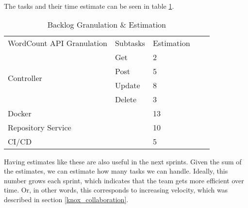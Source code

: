 The tasks and their time estimate can be seen in table \ref{BacklogEstimationSprint3}.
\begin{table}[h]
\centering
\begin{tabular}{|l|l|l|ll}
\cline{1-3}
WordCount API Granulation   & Subtasks & Estimation &  &  \\ \cline{1-3}
\multirow{4}{*}{Controller} & Get      & 2          &  &  \\ \cline{2-3}
                            & Post     & 5          &  &  \\ \cline{2-3}
                            & Update   & 8          &  &  \\ \cline{2-3}
                            & Delete   & 3          &  &  \\ \cline{1-3}
Docker                      &          & 13         &  &  \\ \cline{1-3}
Repository Service          &          & 10         &  &  \\ \cline{1-3}
CI/CD                       &          & 5          &  &  \\ \cline{1-3}
\end{tabular}
\caption{Backlog Granulation \& Estimation}
\label{BacklogEstimationSprint3}
\end{table}

Having estimates like these are also useful in the next sprints. Given the sum of the estimates, we can estimate how many tasks we can handle. Ideally, this number grows each sprint, which indicates that the team gets more efficient over time. Or, in other words, this corresponds to increasing velocity, which was described in section \ref{knox_collaboration}.